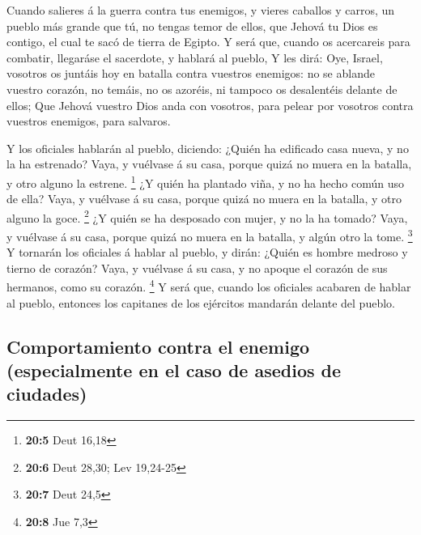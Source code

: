  Cuando salieres á la guerra contra tus enemigos, y vieres
caballos y carros, un pueblo más grande que tú, no tengas temor de
ellos, que Jehová tu Dios es contigo, el cual te sacó de tierra de
Egipto.  Y será que, cuando os acercareis para combatir,
llegaráse el sacerdote, y hablará al pueblo,  Y les dirá:
Oye, Israel, vosotros os juntáis hoy en batalla contra vuestros
enemigos: no se ablande vuestro corazón, no temáis, no os azoréis, ni
tampoco os desalentéis delante de ellos;  Que Jehová vuestro
Dios anda con vosotros, para pelear por vosotros contra vuestros
enemigos, para salvaros.

 Y los oficiales hablarán al pueblo, diciendo: ¿Quién ha
edificado casa nueva, y no la ha estrenado? Vaya, y vuélvase á su casa,
porque quizá no muera en la batalla, y otro alguno la estrene.
\footnote{\textbf{20:5} Deut 16,18}  ¿Y quién ha plantado
viña, y no ha hecho común uso de ella? Vaya, y vuélvase á su casa,
porque quizá no muera en la batalla, y otro alguno la goce. \footnote{\textbf{20:6}
  Deut 28,30; Lev 19,24-25}  ¿Y quién se ha desposado con
mujer, y no la ha tomado? Vaya, y vuélvase á su casa, porque quizá no
muera en la batalla, y algún otro la tome. \footnote{\textbf{20:7} Deut
  24,5}  Y tornarán los oficiales á hablar al pueblo, y
dirán: ¿Quién es hombre medroso y tierno de corazón? Vaya, y vuélvase á
su casa, y no apoque el corazón de sus hermanos, como su corazón.
\footnote{\textbf{20:8} Jue 7,3}  Y será que, cuando los
oficiales acabaren de hablar al pueblo, entonces los capitanes de los
ejércitos mandarán delante del pueblo.

\hypertarget{comportamiento-contra-el-enemigo-especialmente-en-el-caso-de-asedios-de-ciudades}{%
\subsection{Comportamiento contra el enemigo (especialmente en el caso
de asedios de
ciudades)}\label{comportamiento-contra-el-enemigo-especialmente-en-el-caso-de-asedios-de-ciudades}}

